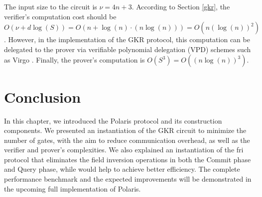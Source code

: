 The input size to the circuit is $\nu = 4n + 3$. According to Section \ref{gkr}, the verifier's computation cost should be $O(\nu + d\log(S)) = O(n + \log(n) \cdot (n\log(n))) = O(n (\log(n))^2)$. However, in the implementation of the GKR protocol, this computation can be delegated to the prover via verifiable polynomial delegation (VPD) schemes such as Virgo \cite{Zhang2020Virgo}. Finally, the prover's computation is $O(S^3)=O((n\log(n))^3)$.

\section{Conclusion}
In this chapter, we introduced the Polaris protocol and its construction components. We presented an instantiation of the GKR circuit to minimize the number of gates, with the aim to reduce communication overhead, as well as the verifier and prover's complexities. We also explained an instantiation of the \gls{fri} protocol that eliminates the field inversion operations in both the Commit phase and Query phase, while would help to achieve better efficiency.  The complete performance benchmark and the expected improvements will be demonstrated in the upcoming full implementation of Polaris.
